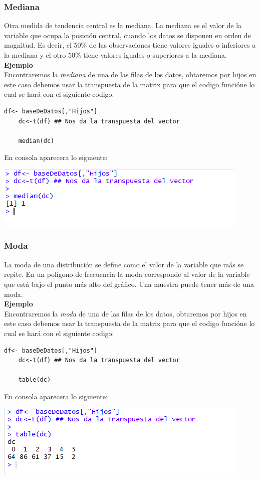 \documentclass[12pt,hidelinks]{article}
\begin{document}
	\subsubsection{Mediana}
	Otra medida de tendencia central es la mediana. La mediana es el valor de la variable que ocupa la posición central, cuando los datos se disponen en orden de magnitud. Es decir, el 50\% de las observaciones tiene valores iguales o inferiores a la mediana y el otro 50\% tiene valores iguales o superiores a la mediana.\\
	\textbf{Ejemplo}\\
	\vspace{2mm}
	Encontraremos la \textit{mediana} de una de las filas de los datos, obtaremos por hijos  en este caso debemos usar la transpuesta de la matrix para que el codigo funcióne lo cual se hará con el siguiente codigo:
	\begin{lstlisting}[frame=single]
	df<- baseDeDatos[,"Hijos"]
	dc<-t(df) ## Nos da la transpuesta del vector
	
	median(dc)
	\end{lstlisting}
	En consola aparecera lo siguiente:
	\begin{center}
		\includegraphics[]{Mediana.PNG}
	\end{center}
	\subsubsection{Moda}
	La moda de una distribución se define como el valor de la variable que más se repite. En un polígono de frecuencia la moda corresponde al valor de la variable que está bajo el punto más alto del gráfico. Una muestra puede tener más de una moda.\\
	\textbf{Ejemplo}\\
	\vspace{2mm}
	Encontraremos la \textit{moda} de una de las filas de los datos, obtaremos por hijos  en este caso debemos usar la transpuesta de la matrix para que el codigo funcióne lo cual se hará con el siguiente codigo:
	\begin{lstlisting}[frame=single]
	df<- baseDeDatos[,"Hijos"]
	dc<-t(df) ## Nos da la transpuesta del vector
	
	table(dc)
	\end{lstlisting}
	En consola aparecera lo siguiente:
	\begin{center}
		\includegraphics[]{Moda.PNG}
	\end{center}
\end{document}
